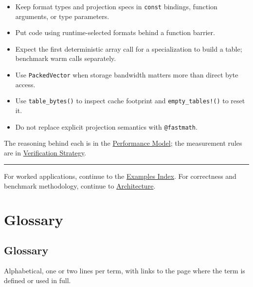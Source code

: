 \label{15543690777485812783}{}


\begin{itemize}
\item Keep format types and projection specs in \texttt{const} bindings, function arguments, or type parameters.


\item Put code using runtime-selected formats behind a function barrier.


\item Expect the first deterministic array call for a specialization to build a table; benchmark warm calls separately.


\item Use \texttt{PackedVector} when storage bandwidth matters more than direct byte access.


\item Use \texttt{table\_\allowbreak{}bytes()} to inspect cache footprint and \texttt{empty\_\allowbreak{}tables!()} to reset it.


\item Do not replace explicit projection semantics with \texttt{@fastmath}.

\end{itemize}


The reasoning behind each is in the \href{concept\_\allowbreak{}performance.md}{Performance Model}; the measurement rules are in \href{internals\_\allowbreak{}verification.md}{Verification Strategy}.



{\rule{\textwidth}{1pt}}


For worked applications, continue to the \href{examples\_\allowbreak{}gallery.md}{Examples Index}. For correctness and benchmark methodology, continue to \href{internals\_\allowbreak{}architecture.md}{Architecture}.



\chapter{Glossary}


\section{Glossary}



\label{5283940344096028924}{}


Alphabetical, one or two lines per term, with links to the page where the term is defined or used in full.




